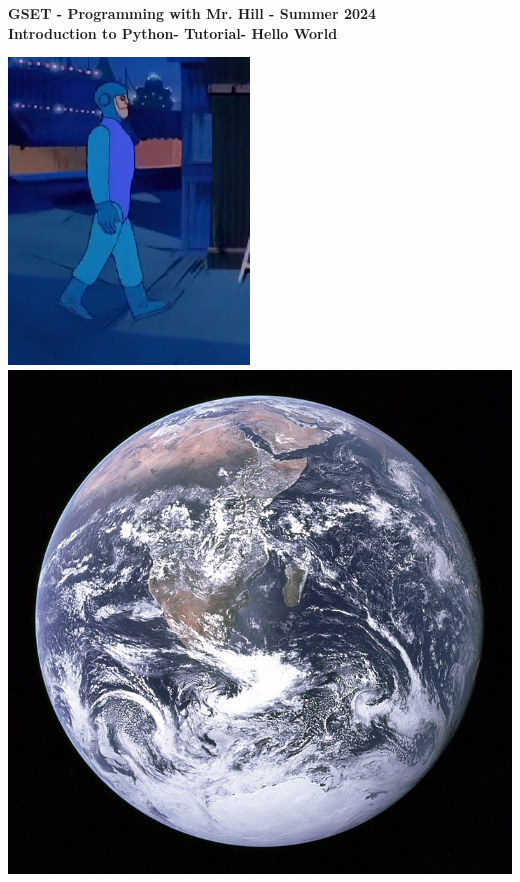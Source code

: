 \documentclass[12pt]{article}
\newcommand{\MNUM}{0} %
\newcommand{\MNAME}{Introduction to Python} %
\newcommand{\TNAME}{Hello World} %
\newcommand{\SEM}{Summer 2024} %
\begin{document}
\thispagestyle{plain}

\begin{center}
   {\bf \large GSET - Programming with Mr. Hill - \SEM} \vspace{5mm}\\
   {\bf \Large \MNAME \hspc -  Tutorial\hspc\MNUM\hspc - \TNAME}\vspace{3mm}\\
   
\end{center}

 \hspace*{3cm}\includegraphics[scale=.6]{charlie_robot_sideview.png} \hspace*{1cm}\includegraphics[scale=.18]{blue_marble.jpg}
\end{document}
